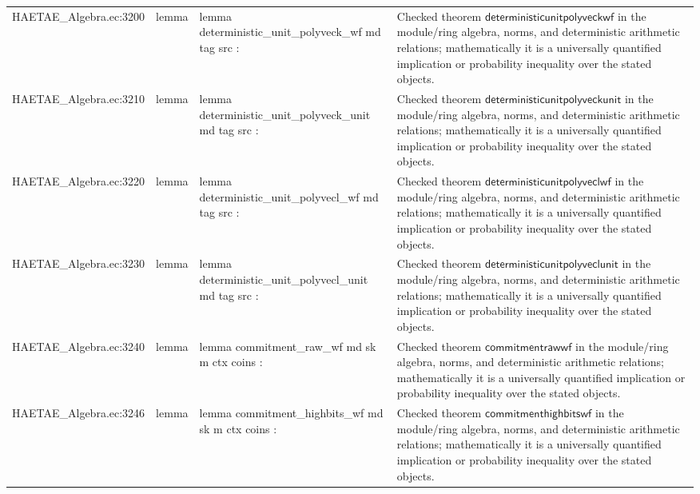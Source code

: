\documentclass[10pt]{article}
\begin{document}
\begin{longtable}{L{0.11\textwidth}L{0.055\textwidth}L{0.385\textwidth}L{0.41\textwidth}}
HAETAE\_\allowbreak{}Algebra.\allowbreak{}ec:\allowbreak{}3200 & lemma & {\ttfamily\scriptsize lemma deterministic\_\allowbreak{}unit\_\allowbreak{}polyveck\_\allowbreak{}wf md tag src :} & Checked theorem $\mathsf{deterministicunitpolyveckwf}$ in the module/ring algebra, norms, and deterministic arithmetic relations; mathematically it is a universally quantified implication or probability inequality over the stated objects. \\
HAETAE\_\allowbreak{}Algebra.\allowbreak{}ec:\allowbreak{}3210 & lemma & {\ttfamily\scriptsize lemma deterministic\_\allowbreak{}unit\_\allowbreak{}polyveck\_\allowbreak{}unit md tag src :} & Checked theorem $\mathsf{deterministicunitpolyveckunit}$ in the module/ring algebra, norms, and deterministic arithmetic relations; mathematically it is a universally quantified implication or probability inequality over the stated objects. \\
HAETAE\_\allowbreak{}Algebra.\allowbreak{}ec:\allowbreak{}3220 & lemma & {\ttfamily\scriptsize lemma deterministic\_\allowbreak{}unit\_\allowbreak{}polyvecl\_\allowbreak{}wf md tag src :} & Checked theorem $\mathsf{deterministicunitpolyveclwf}$ in the module/ring algebra, norms, and deterministic arithmetic relations; mathematically it is a universally quantified implication or probability inequality over the stated objects. \\
HAETAE\_\allowbreak{}Algebra.\allowbreak{}ec:\allowbreak{}3230 & lemma & {\ttfamily\scriptsize lemma deterministic\_\allowbreak{}unit\_\allowbreak{}polyvecl\_\allowbreak{}unit md tag src :} & Checked theorem $\mathsf{deterministicunitpolyveclunit}$ in the module/ring algebra, norms, and deterministic arithmetic relations; mathematically it is a universally quantified implication or probability inequality over the stated objects. \\
HAETAE\_\allowbreak{}Algebra.\allowbreak{}ec:\allowbreak{}3240 & lemma & {\ttfamily\scriptsize lemma commitment\_\allowbreak{}raw\_\allowbreak{}wf md sk m ctx coins :} & Checked theorem $\mathsf{commitmentrawwf}$ in the module/ring algebra, norms, and deterministic arithmetic relations; mathematically it is a universally quantified implication or probability inequality over the stated objects. \\
HAETAE\_\allowbreak{}Algebra.\allowbreak{}ec:\allowbreak{}3246 & lemma & {\ttfamily\scriptsize lemma commitment\_\allowbreak{}highbits\_\allowbreak{}wf md sk m ctx coins :} & Checked theorem $\mathsf{commitmenthighbitswf}$ in the module/ring algebra, norms, and deterministic arithmetic relations; mathematically it is a universally quantified implication or probability inequality over the stated objects. \\

\end{longtable}
\end{document}
